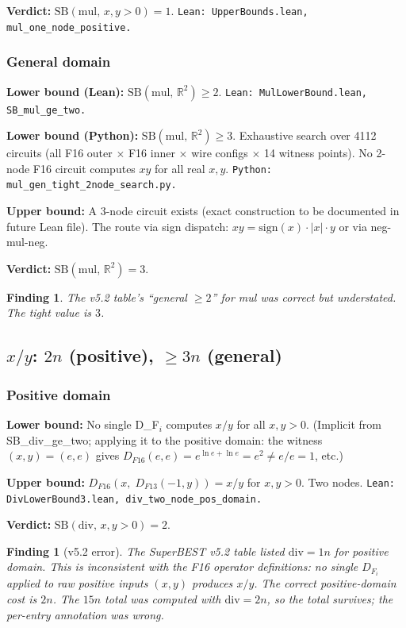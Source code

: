 \documentclass[11pt]{article}
\newtheorem{finding}[theorem]{Finding}
\newcommand{\lv}[1]{\textcolor{lean}{\texttt{#1}}}
\newcommand{\pv}[1]{\textcolor{python}{\texttt{#1}}}
\newcommand{\bad}[1]{\textcolor{bad}{#1}}
\begin{document}
\textbf{Verdict:} $\mathrm{SB}(\mathrm{mul},\, x,y>0) = 1$. \lv{Lean: UpperBounds.lean, mul\_one\_node\_positive.}

\subsubsection*{General domain}

\textbf{Lower bound (Lean):} $\mathrm{SB}(\mathrm{mul},\,\mathbb{R}^2) \geq 2$. \lv{Lean: MulLowerBound.lean, SB\_mul\_ge\_two.}

\textbf{Lower bound (Python):} $\mathrm{SB}(\mathrm{mul},\,\mathbb{R}^2) \geq 3$.
Exhaustive search over 4112 circuits (all F16 outer $\times$ F16 inner $\times$ wire configs $\times$ 14 witness points).
No 2-node F16 circuit computes $xy$ for all real $x,y$. \pv{Python: mul\_gen\_tight\_2node\_search.py.}

\textbf{Upper bound:} A 3-node circuit exists (exact construction to be documented in future Lean file).
The route via sign dispatch: $xy = \mathrm{sign}(x) \cdot |x| \cdot y$ or via neg-mul-neg.

\textbf{Verdict:} $\mathrm{SB}(\mathrm{mul},\,\mathbb{R}^2) = 3$.

\begin{finding}
The v5.2 table's ``general $\geq 2$'' for mul was correct but understated. The tight value is $3$.
\end{finding}

\subsection{$x / y$: $2n$ (positive), $\geq 3n$ (general)}

\subsubsection*{Positive domain}

\textbf{Lower bound:} No single D\_F$_i$ computes $x/y$ for all $x,y > 0$.
(Implicit from SB\_div\_ge\_two; applying it to the positive domain: the witness
$(x,y) = (e, e)$ gives $D_{F16}(e,e) = e^{\ln e + \ln e} = e^2 \neq e/e = 1$, etc.)

\textbf{Upper bound:} $D_{F16}(x,\; D_{F13}(-1,y)) = x/y$ for $x,y > 0$. Two nodes.
\lv{Lean: DivLowerBound3.lean, div\_two\_node\_pos\_domain.}

\textbf{Verdict:} $\mathrm{SB}(\mathrm{div},\, x,y>0) = 2$.

\begin{finding}[\bad{v5.2 error}]
The SuperBEST v5.2 table listed $\mathrm{div} = 1n$ for positive domain.
This is inconsistent with the F16 operator definitions: no single $D_{F_i}$ applied to
raw positive inputs $(x,y)$ produces $x/y$. The correct positive-domain cost is $2n$.
The $15n$ total was computed with $\mathrm{div} = 2n$, so the total survives; the per-entry
annotation was wrong.
\end{finding}
\end{document}
